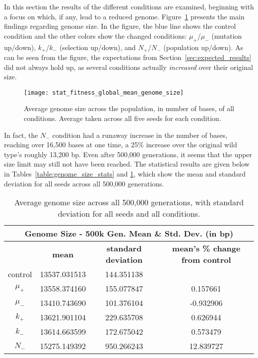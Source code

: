 In this section the results of the different conditions are examined, beginning with a focus on which, if any, lead to a reduced genome. Figure~\ref{fig:genome_size} presents the main findings regarding genome size. In the figure, the blue line shows the control condition and the other colors show the changed conditions: $\mu_+$/$\mu_-$ (mutation up/down), $k_+$/$k_-$ (selection up/down), and $N_+$/$N_-$ (population up/down). As can be seen from the figure, the expectations from Section~\ref{sec:expected_results} did not always hold up, as several conditions actually \textit{increased} over their original size. 
\begin{figure}[H]
	\texttt{[image: stat\_fitness\_global\_mean\_genome\_size]}
	\centering
	\caption[Genome size]{Average genome size across the population, in number of bases, of all conditions. Average taken across all five seeds for each condition.}
	\label{fig:genome_size}
\end{figure}
In fact, the $N_-$ condition had a runaway increase in the number of bases, reaching over 16,500 bases at one time, a 25\% increase over the original wild type's roughly 13,200 bp. Even after 500,000 generations, it seems that the upper size limit may still not have been reached. The statistical results are given below in Tables~\ref{table:genome_size_stats} and \ref{table:genome_size_mean_and_std_dev}, which show the mean and standard deviation for all seeds across all 500,000 generations. 

\begin{table}[H]
	\begin{tabular}{|c|c|c|c|}
		\hline
		\multicolumn{4}{c}{\Large \textbf{Genome Size - 500k Gen. Mean \& Std. Dev. (in bp)}} \\
		\hline
		 & \textbf{mean} & \textbf{standard deviation} & \textbf{mean's \% change from control} \\
		 \hline
		 control & 13537.031513 & 144.351138 & \textemdash \\ 
		 \hline
		 $\mu_+$ & 13558.374160 & 155.077847 & 0.157661 \\ 
		 \hline
		 $\mu_-$ & 13410.743690 & 101.376104 & -0.932906 \\ 
		 \hline
		 $k_+$ & 13621.901104 & 229.635708 & 0.626944 \\ 
		 \hline
		 $k_-$ & 13614.663599 & 172.675042 & 0.573479 \\ 
		 \hline
		 $N_-$ & 15275.149392 & 950.266243 & 12.839727 \\ 
		 \hline
	\end{tabular}
	\caption[Genome size - mean and std. dev.]{Average genome size across all 500,000 generations, with standard deviation for all seeds and all conditions. }
	\label{table:genome_size_mean_and_std_dev}
\end{table}

